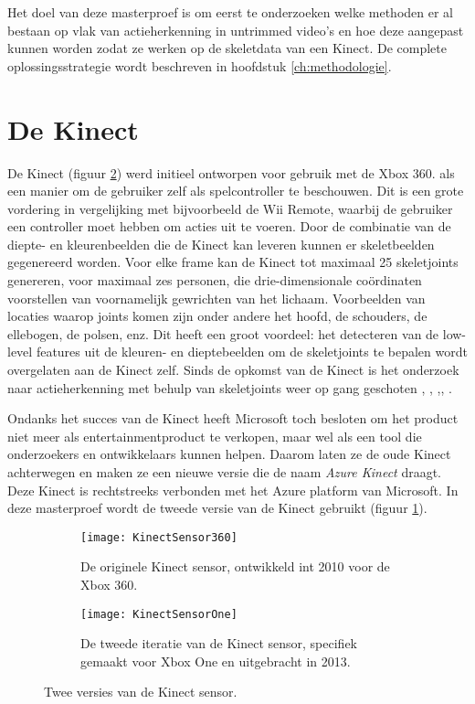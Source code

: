 Het doel van deze masterproef is om eerst te onderzoeken welke methoden er al bestaan op vlak van actieherkenning in untrimmed video's en hoe deze aangepast kunnen worden zodat ze werken op de skeletdata van een Kinect. De complete oplossingsstrategie wordt beschreven in hoofdstuk \ref{ch:methodologie}.



\section{De Kinect}
De Kinect (figuur \ref{fig:KinectSensorVersies}) werd initieel ontworpen voor gebruik met de Xbox 360.  als een manier om de gebruiker zelf als spelcontroller te beschouwen. Dit is een grote vordering in vergelijking met bijvoorbeeld de Wii Remote, waarbij de gebruiker een controller moet hebben om acties uit te voeren. Door de combinatie van de diepte- en kleurenbeelden die de Kinect kan leveren kunnen er skeletbeelden gegenereerd worden. Voor elke frame kan de Kinect tot maximaal 25 skeletjoints genereren, voor maximaal zes personen, die drie-dimensionale coördinaten voorstellen van voornamelijk gewrichten van het lichaam. Voorbeelden van locaties waarop joints komen zijn onder andere het hoofd, de schouders, de ellebogen, de polsen, enz. Dit heeft een groot voordeel: het detecteren van de low-level features uit de kleuren- en dieptebeelden om de skeletjoints te bepalen wordt overgelaten aan de Kinect zelf. Sinds de opkomst van de Kinect is het onderzoek naar actieherkenning met behulp van skeletjoints weer op gang geschoten \cite{Deboeverie2016}, \cite{Xia2012}, \cite{Wang2014},\cite{Vemulapalli2014}, \cite{Li2018}.

Ondanks het succes van de Kinect heeft Microsoft toch besloten om het product niet meer als entertainmentproduct te verkopen, maar wel als een tool die onderzoekers en ontwikkelaars kunnen helpen. Daarom laten ze de oude Kinect achterwegen en maken ze een nieuwe versie  die de  naam \textit{Azure Kinect} draagt. Deze Kinect is rechtstreeks verbonden met het Azure platform van Microsoft. In deze masterproef wordt de tweede versie van de Kinect gebruikt (figuur \ref{fig:KinectSensorOne}).

\begin{figure}
	\begin{subfigure}[t]{0.48\textwidth}
		\texttt{[image: KinectSensor360]}
		\caption{De originele Kinect sensor, ontwikkeld int 2010 voor de Xbox 360.}
	\end{subfigure}
	\begin{subfigure}[t]{0.48\textwidth}
		\texttt{[image: KinectSensorOne]}
		\caption{De tweede iteratie van de Kinect sensor, specifiek gemaakt voor Xbox One en uitgebracht in 2013.}
		\label{fig:KinectSensorOne}
	\end{subfigure}
	\caption{Twee versies van de Kinect sensor.}
	\label{fig:KinectSensorVersies}
\end{figure}

